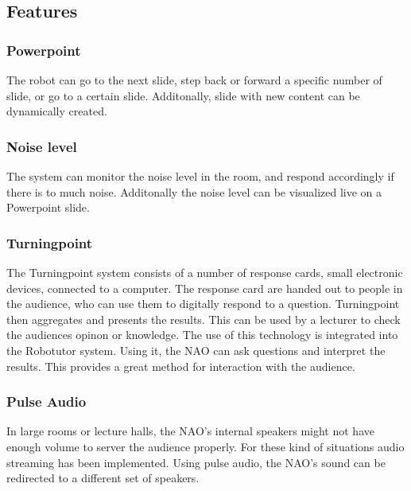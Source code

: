 
\subsection{Features}
\subsubsection{Powerpoint}
The robot can go to the next slide, step back or forward a specific number of slide, or go to a certain slide. Additonally, slide with new content can be dynamically created.

\subsubsection{Noise level}
The system can monitor the noise level in the room, and respond accordingly if there is to much noise. Additonally the noise level can be visualized live on a Powerpoint slide.

\subsubsection{Turningpoint}
The Turningpoint system consists of a number of response cards, small electronic devices, connected to a computer. The response card are handed out to people in the audience, who can use them to digitally respond to a question. Turningpoint then aggregates and presents the results. This can be used by a lecturer to check the audiences opinon or knowledge. The use of this technology is integrated into the Robotutor system. Using it, the NAO can ask questions and interpret the results. This provides a great method for interaction with the audience.

\subsubsection{Pulse Audio}
In large rooms or lecture halls, the NAO's internal speakers might not have enough volume to server the audience properly. For these kind of situations audio streaming has been implemented. Using pulse audio, the NAO's sound can be redirected to a different set of speakers.
